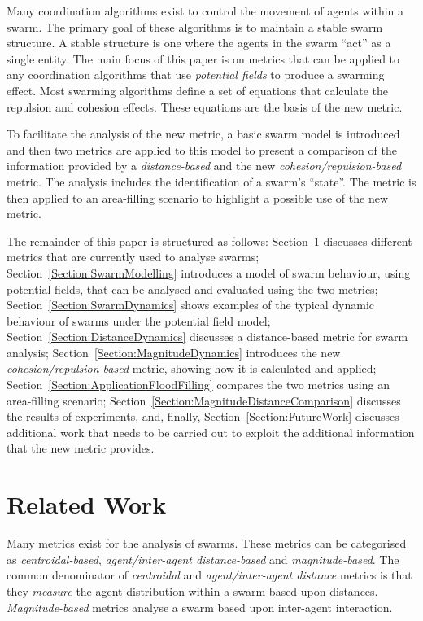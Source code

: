 \documentclass{ieeeaccess}
\begin{document}
Many coordination algorithms exist to control the movement of agents within a
swarm. The primary goal of these algorithms is to maintain a stable swarm
structure. A stable structure is one where the agents in the swarm ``act'' as a
single entity. The main focus of this paper is on metrics that can be
applied to any coordination algorithms that use \textit{potential fields} to
produce a swarming effect. Most swarming algorithms define a set of equations
that calculate the repulsion and cohesion effects. These equations are the
basis of the new metric. 

To facilitate the analysis of the new metric, a basic swarm model is introduced
and then two metrics are applied to this model to present a comparison of the
information provided by a \textit{distance-based} and the new
\textit{cohesion/repulsion-based} metric. The analysis includes the
identification of a swarm's ``state''. The metric is then applied to an 
area-filling scenario to highlight a possible use of the new metric. 

The remainder of this paper is structured as follows:
Section~\ref{Section:Related} discusses different metrics that are currently
used to analyse swarms; Section~\ref{Section:SwarmModelling} introduces a 
model of swarm behaviour, using potential fields, that can be analysed and evaluated using
the two metrics; Section~\ref{Section:SwarmDynamics} shows examples of the typical
dynamic behaviour of swarms under the potential field model;
Section~\ref{Section:DistanceDynamics} discusses a distance-based metric for
swarm analysis; Section~\ref{Section:MagnitudeDynamics} introduces the new
\textit{cohesion/repulsion-based} metric, showing how it is calculated and
applied; Section~\ref{Section:ApplicationFloodFilling} compares the two metrics
using an area-filling scenario;
Section~\ref{Section:MagnitudeDistanceComparison} discusses the results of
experiments, and, finally, Section~\ref{Section:FutureWork} discusses
additional work that needs to be carried out to exploit the additional
information that the new metric provides.

\section{Related Work}\label{Section:Related}

Many metrics exist for the analysis of swarms. These metrics can be categorised
as \textit{centroidal-based}, \textit{agent/inter-agent distance-based} and
\textit{magnitude-based}. The common denominator of \textit{centroidal} and
\textit{agent/inter-agent distance} metrics is that they \textit{measure} the
agent distribution within a swarm based upon distances.
\textit{Magnitude-based} metrics analyse a swarm based upon inter-agent
interaction. 
\end{document}
